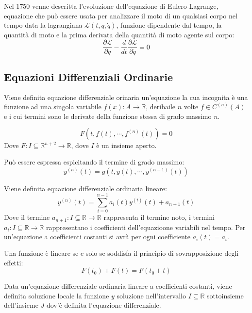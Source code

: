 \documentclass{article}
\numberwithin{equation}{subsection}
\begin{document}
Nel 1750 venne descritta l'evoluzione dell'equazione di Eulero-Lagrange, equazione che può essere usata per analizzare il moto di un qualsiasi corpo nel tempo data la 
lagrangiana $\mathscr{L}(t,q,\dot q)$, funzione dipendente dal tempo, la quantità di moto e la prima derivata della quantità di moto agente sul corpo:
\begin{equation}
    \displaystyle\frac{\partial \mathscr{L}}{\partial q}-\frac{d}{dt}\frac{\partial \mathscr{L}}{\partial\dot q}=0
\end{equation}

\subsection{Equazioni Differenziali Ordinarie}

Viene definita equazione differenziale orinaria un'equazione la cua incognita è una funzione ad una singola variabile $f(x):A\to\mathbb{R}$, deribaile $n$ volte $f\in C^{(n)}(A)$ 
e i cui termini sono le derivate della funzione stessa di grado massimo $n$.

\begin{equation}
    F(t,f(t),\cdots,f^{(n)}(t))=0
\end{equation}
Dove $F:I\subseteq\mathbb{R}^{n+2}\to\mathbb{R}$, dove $I$ è un insieme aperto. 

Può essere espressa espicitando il termine di grado massimo:
\begin{equation}
    y^{(n)}(t)=g(t,y(t),\cdots,y^{(n-1)}(t))
\end{equation}

Viene definita equazione differenziale ordinaria lineare:
\begin{equation}
    y^{(n)}(t)=\displaystyle\sum_{i=0}^{n-1}a_i(t)y^{(i)}(t)+a_{n+1}(t)
\end{equation}
Dove il termine $a_{n+1}:I\subseteq\mathbb{R}\to\mathbb{R}$ rappresenta il termine noto, i termini $a_i:I\subseteq\mathbb{R}\to\mathbb{R}$ rappresentano i coefficienti 
dell'equazioone variabili nel tempo. Per un'equazione a coefficienti costanti si avrà per ogni coefficiente $a_i(t)=a_i$. 


Una funzione è lineare se e solo se soddisfa il principio di sovrapposizione degli effetti:
\begin{equation}
    F(t_0)+F(t)=F(t_0+t)
\end{equation}




Data un'equazione differenziale ordinaria lineare a coefficienti costanti, viene definita soluzione locale la funzione $y$ soluzione  
nell'intervallo $I\subseteq\mathbb{R}$ sottoinsieme dell'insieme $J$ dov'è definita l'equazione differenziale.
\end{document}
